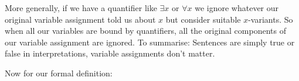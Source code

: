 %

More generally, if we have a quantifier like $\exists x$ or $\forall x$ we ignore whatever our original variable assignment told us about $x$ but consider suitable $x$-variants. So when all our variables are bound by quantifiers, all the original components of our variable assignment are ignored. To summarise: Sentences are simply true or false in interpretations, variable assignments don't matter.

 Now for our formal definition:


